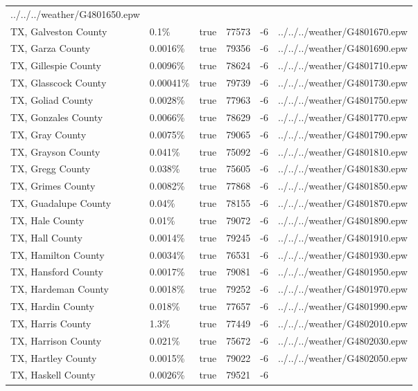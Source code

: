 \begin{longtable}[]{@{}llllll@{}}
../../../weather/G4801650.epw \\
TX, Galveston County & 0.1\% & true & 77573 & -6 &
../../../weather/G4801670.epw \\
TX, Garza County & 0.0016\% & true & 79356 & -6 &
../../../weather/G4801690.epw \\
TX, Gillespie County & 0.0096\% & true & 78624 & -6 &
../../../weather/G4801710.epw \\
TX, Glasscock County & 0.00041\% & true & 79739 & -6 &
../../../weather/G4801730.epw \\
TX, Goliad County & 0.0028\% & true & 77963 & -6 &
../../../weather/G4801750.epw \\
TX, Gonzales County & 0.0066\% & true & 78629 & -6 &
../../../weather/G4801770.epw \\
TX, Gray County & 0.0075\% & true & 79065 & -6 &
../../../weather/G4801790.epw \\
TX, Grayson County & 0.041\% & true & 75092 & -6 &
../../../weather/G4801810.epw \\
TX, Gregg County & 0.038\% & true & 75605 & -6 &
../../../weather/G4801830.epw \\
TX, Grimes County & 0.0082\% & true & 77868 & -6 &
../../../weather/G4801850.epw \\
TX, Guadalupe County & 0.04\% & true & 78155 & -6 &
../../../weather/G4801870.epw \\
TX, Hale County & 0.01\% & true & 79072 & -6 &
../../../weather/G4801890.epw \\
TX, Hall County & 0.0014\% & true & 79245 & -6 &
../../../weather/G4801910.epw \\
TX, Hamilton County & 0.0034\% & true & 76531 & -6 &
../../../weather/G4801930.epw \\
TX, Hansford County & 0.0017\% & true & 79081 & -6 &
../../../weather/G4801950.epw \\
TX, Hardeman County & 0.0018\% & true & 79252 & -6 &
../../../weather/G4801970.epw \\
TX, Hardin County & 0.018\% & true & 77657 & -6 &
../../../weather/G4801990.epw \\
TX, Harris County & 1.3\% & true & 77449 & -6 &
../../../weather/G4802010.epw \\
TX, Harrison County & 0.021\% & true & 75672 & -6 &
../../../weather/G4802030.epw \\
TX, Hartley County & 0.0015\% & true & 79022 & -6 &
../../../weather/G4802050.epw \\
TX, Haskell County & 0.0026\% & true & 79521 & -6 &

\end{longtable}
